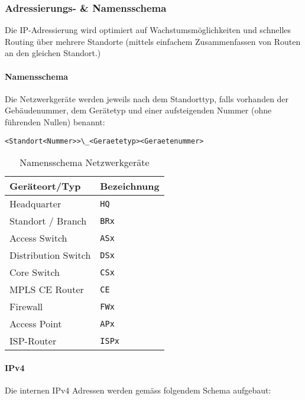 


\subsubsection{Adressierungs- \& Namensschema}

Die IP-Adressierung wird optimiert auf Wachstumsmöglichkeiten und schnelles Routing über mehrere Standorte (mittels einfachem Zusammenfassen von Routen an den gleichen Standort.)

\paragraph{Namensschema}

Die Netzwerkgeräte werden jeweils nach dem Standorttyp, falls vorhanden der Gebäudenummer, dem Gerätetyp und einer aufsteigenden Nummer (ohne führenden Nullen) benannt:

\lstinline|<Standort<Nummer>>\_<Geraetetyp><Geraetenummer>|

\begin{table}[h]
	\centering
	\begin{tabu}{l l}
		\toprule 
		Geräteort/Typ & Bezeichnung \\
		\midrule
		Headquarter & \lstinline|HQ|\\
		Standort / Branch & \lstinline|BRx| \\
		\midrule
		Access Switch & \lstinline|ASx|\\
		Distribution Switch & \lstinline|DSx|\\
		Core Switch & \lstinline|CSx|\\
		MPLS CE Router & \lstinline|CE|\\
		Firewall & \lstinline|FWx| \\
		Access Point & \lstinline|APx| \\
		ISP-Router & \lstinline|ISPx| \\
		\bottomrule
	\end{tabu}
	\label{tbl:abteilung_ipv4_adressblock}
	\caption{Namensschema Netzwerkgeräte}
\end{table}

\paragraph{IPv4}
Die internen IPv4 Adressen werden gemäss folgendem Schema aufgebaut: 

